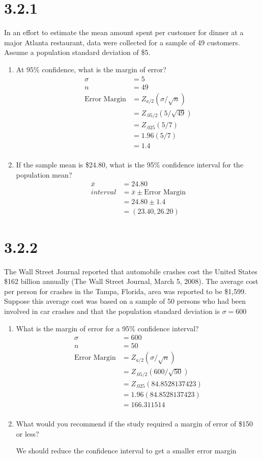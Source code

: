 \documentclass{article}
\begin{document}
\section*{3.2.1}
In an effort to estimate the mean amount spent per customer for dinner at a major Atlanta restaurant, data were collected for a sample of 49 customers. Assume a population standard deviation of \$5.
\begin{enumerate}
  \item At 95\% confidence, what is the margin of error?
  \begin{align*}
    \sigma &= 5\\
    n &= 49\\
    \text{Error Margin} &= Z_{a/2}(\sigma / \sqrt{n})\\
    &=Z_{.05/2}(5/ \sqrt{49})\\
    &=Z_{.025}(5/7)\\
    &=1.96(5/7)\\
    &=1.4\\
  \end{align*}
  \item If the sample mean is \$24.80, what is the 95\% confidence interval for the population mean?
  \begin{align*}
    \bar{x} &= 24.80\\
    interval &= \bar{x} \pm \text{Error Margin}\\
    &= 24.80 \pm 1.4\\
    &= (23.40, 26.20)
  \end{align*}
\end{enumerate}

\section*{3.2.2}
The Wall Street Journal reported that automobile crashes cost the United States \$162 billion annually (The Wall Street Journal, March 5, 2008). The average cost per person for crashes in the Tampa, Florida, area was reported to be \$1,599. Suppose this average cost was based on a sample of 50 persons who had been involved in car crashes and that the population standard deviation is $\sigma = 600$
\begin{enumerate}
  \item What is the margin of error for a 95\% confidence interval?
  \begin{align*}
    \sigma &= 600\\
    n &= 50\\
    \text{Error Margin} &= Z_{a/2}(\sigma / \sqrt{n})\\
    &=Z_{.05/2}(600/ \sqrt{50})\\
    &=Z_{.025}(84.8528137423)\\
    &=1.96(84.8528137423)\\
    &=166.311514\\
  \end{align*}
  \item What would you recommend if the study required a margin of error of \$150 or less?

  We should reduce the confidence interval to get a smaller error margin
\end{enumerate}
\end{document}
